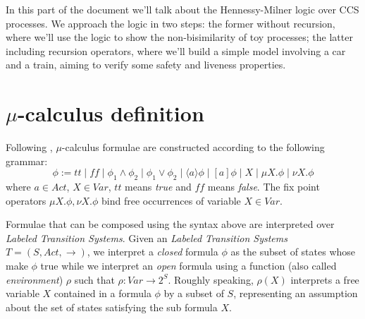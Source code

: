 In this part of the document we'll talk about the Hennessy-Milner
logic over CCS processes. We approach the logic in two steps: the
former without recursion, where we'll use the logic to show the
non-bisimilarity of toy processes; the latter including recursion
operators, where we'll build a simple model involving a car and a
train, aiming to verify some safety and liveness properties.

\section{$\mu$-calculus definition}
Following \cite{MuScSt1999}, $\mu$-calculus formulae are constructed
according to the following grammar:
\begin{displaymath}
  \phi := tt \mid ff \mid \phi_1 \wedge \phi_2 \mid \phi_1 \vee \phi_2 \mid
  \langle a \rangle \phi \mid [a]\phi \mid X \mid \mu X.\phi
  \mid \nu X.\phi
\end{displaymath}
where $a \in Act$, $X \in Var$, $tt$ means \emph{true} and $ff$ means
\emph{false}. The fix point operators $\mu X.\phi, \nu X.\phi$ bind
free occurrences of variable $X \in Var$.

Formulae that can be composed using the syntax above are interpreted
over \emph{Labeled Transition Systems}. Given an \emph{Labeled
  Transition Systems} $T = (S, Act, \rightarrow)$, we interpret a
\emph{closed} formula $\phi$ as the subset of states whose make $\phi$
true while we interpret an \emph{open} formula using a function (also
called \emph{environment}) $\rho$ such that $\rho: Var \rightarrow
2^S$. Roughly speaking, $\rho(X)$ interprets a free variable $X$
contained in a formula $\phi$ by a subset of $S$, representing an
assumption about the set of states satisfying the sub formula $X$.

